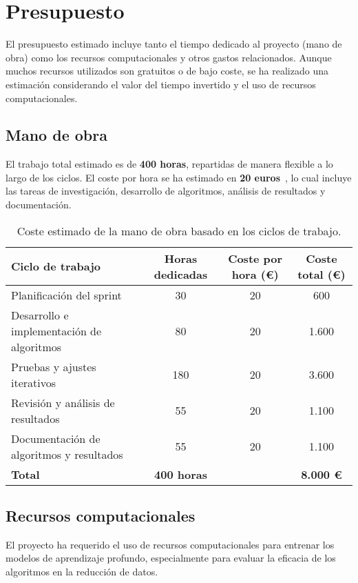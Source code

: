 \section{Presupuesto}\label{sec:presupuesto}
El presupuesto estimado incluye tanto el tiempo dedicado al proyecto (mano de obra) como los recursos computacionales y
otros gastos relacionados.
Aunque muchos recursos utilizados son gratuitos o de bajo coste, se ha realizado una estimación considerando el valor
del tiempo invertido y el uso de recursos computacionales.

\subsection{Mano de obra}\label{subsec:mano-de-obra}
El trabajo total estimado es de \textbf{400 horas}, repartidas de manera flexible a lo largo de los ciclos.
El coste por hora se ha estimado en \textbf{20 euros}~\cite{noauthor_salario_nodate}, lo cual incluye las tareas de
investigación, desarrollo de algoritmos, análisis de resultados y documentación.

\begin{table}[htp]\label{tab:mano-de-obra}
    \centering
    \begin{adjustbox}{width=\linewidth}
        \begin{tabular}{|l|c|c|c|}
            \hline
            \textbf{Ciclo de trabajo} & \textbf{Horas dedicadas} & \textbf{Coste por hora (€)} & \textbf{Coste total (€)} \\ \hline
            Planificación del sprint & 30 & 20 & 600 \\
            Desarrollo e implementación de algoritmos & 80 & 20 & 1.600 \\
            Pruebas y ajustes iterativos & 180 & 20 & 3.600 \\
            Revisión y análisis de resultados & 55 & 20 & 1.100 \\
            Documentación de algoritmos y resultados & 55 & 20 & 1.100 \\ \hline
            \textbf{Total} & \textbf{400 horas} & & \textbf{8.000 €} \\ \hline
        \end{tabular}
    \end{adjustbox}
    \caption{Coste estimado de la mano de obra basado en los ciclos de trabajo.}
\end{table}



\subsection{Recursos computacionales}\label{subsec:recursos-computacionales}
El proyecto ha requerido el uso de recursos computacionales para entrenar los modelos de aprendizaje profundo,
especialmente para evaluar la eficacia de los algoritmos en la reducción de datos. \\[6pt]

